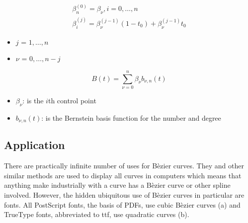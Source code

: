 \documentclass[12pt, letterpaper]{article}
\begin{document}
\begin{singlespace}
  \begin{gather}
    \label{eq:DCRec}
    \beta_{n}^{(0)} = \beta_\nu, i = 0,\ldots, n \\
    \beta_{i}^{(j)} = \beta_{\nu}^{(j-1)} (1 - t_0) + \beta_{\nu}^{(j-1)} t_0
  \end{gather}
  \begin{small}
    \begin{itemize}[label=]
      \item $j$ = $1,\ldots,n$
      \item $\nu$ = $0,\ldots,n-j$
    \end{itemize}
  \end{small}
  \begin{equation}
    \label{eq:DCExplicit}
    B(t) = \sum_{\nu=0}^{n} \beta_\nu b_{\nu,n}(t)
  \end{equation}
  \begin{small}
    \begin{itemize}[label=]
      \item $\beta_\nu$: is the $i$th control point
      \item $b_{\nu,n}(t)$: is the Bernstein basis function for the number and degree
    \end{itemize}
  \end{small}
\end{singlespace}

\subsection{Application}
There are practically infinite number of uses for B\`ezier curves. They and other similar methods are used
to display all curves in computers which means that anything make industrially with a curve has a B\`ezier
curve or other spline involved. However, the hidden ubiquitous use of B\`ezier curves in particular are
fonts. All PostScript fonts, the basis of PDFs, use cubic B\`ezier curves (a) and TrueType fonts,
abbreviated to ttf, use quadratic curves (b).
\end{document}
